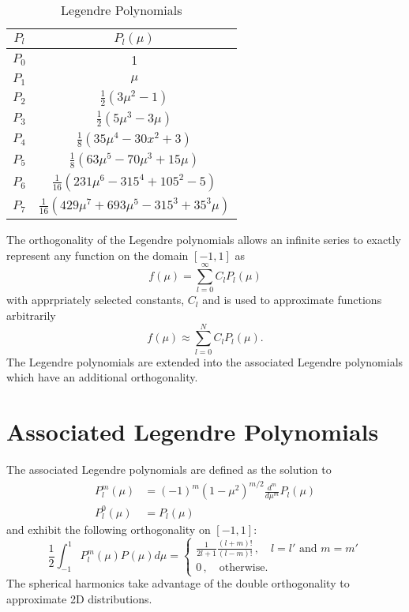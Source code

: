 \begin{table}[ht]
\caption{Legendre Polynomials}
\centering 
\begin{tabular}{c c}
\hline \hline   
$P_l$    & $P_l(\mu)$ \\ [0.5ex] 
\hline
$P_0$ & 1 \\
$P_1$ & $\mu$ \\ 
$P_2$ & $\frac{1}{2}(3\mu^2 - 1)$ \\
$P_3$ & $\frac{1}{2}(5\mu^3 - 3\mu)$ \\
$P_4$ & $\frac{1}{8}(35\mu^4 - 30x^2 + 3)$ \\
$P_5$ & $\frac{1}{8}(63\mu^5 - 70\mu^3 + 15\mu)$ \\
$P_6$ & $\frac{1}{16}(231\mu^6 - 315^4 + 105^2 - 5)$ \\
$P_7$ & $\frac{1}{16}(429\mu^7 + 693\mu^5 - 315^3 + 35^3\mu)$ \\[1ex]
\hline
\end{tabular}
\label{tab:legendre}
\end{table}

The orthogonality of the Legendre polynomials allows an infinite series to exactly represent any function on the domain $[-1, 1]$ as
\begin{equation}
f(\mu) = \sum_{l=0}^{\infty} C_l P_l(\mu)
\end{equation}
with apprpriately selected constants, $C_l$ and is used to approximate functions arbitrarily
\begin{equation}
f(\mu) \approx \sum_{l=0}^{N} C_l P_l(\mu).
\end{equation}
The Legendre polynomials are extended into the associated Legendre polynomials which have an additional orthogonality.

\section{Associated Legendre Polynomials}\label{appdx:assoc}

The associated Legendre polynomials are defined as the solution to
\begin{equation}
\begin{split}
P_l^m(\mu) &= (-1)^m (1-\mu^2)^{m/2} \frac{d^m}{d\mu^m}P_l(\mu) \\
P_l^0(\mu) &= P_l(\mu)
\end{split}
\end{equation}
and exhibit the following orthogonality on $[-1, 1]$:
\begin{equation}
\frac{1}{2} \int_{-1}^{1} P_l^m(\mu) P_{}^{}(\mu) d\mu = 
\begin{cases}
\frac{1}{2l+1} \frac{(l+m)!}{(l-m)!} \,, \quad l=l' \text{ and } m=m'\\
0\,, \quad \text{otherwise}.
\end{cases}
\end{equation}
The spherical harmonics take advantage of the double orthogonality to approximate 2D distributions.

